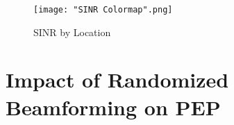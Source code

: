 \documentclass[letterpaper, 10 pt, conference]{ieeetran}  %
\theoremstyle{definition}
\theoremstyle{theorem}
\begin{document}
\begin{figure}
\centering
\texttt{[image: "SINR Colormap".png]}
\caption{SINR by Location}
\label{fig:polar}
\end{figure}








\section{Impact of Randomized Beamforming on \ac{PEP}}
\end{document}
